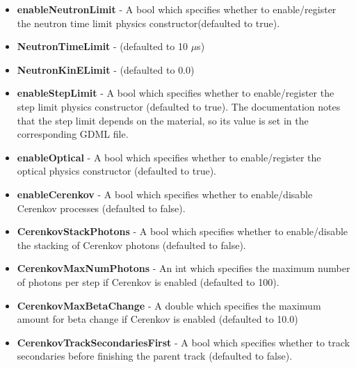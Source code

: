 \documentclass[8pt]{refart}
\begin{document}
\begin{itemize}
\begin{code}{shell}
    G4VPhysicsConstructors in G4PhysicsConstructorRegistry are:
     [  0]  "G4ChargeExchangePhysics"
     [  1]  "G4DecayPhysics"
     [  2]  "G4EmDNAChemistry"
     [  3]  "G4EmDNAChemistry_option1"
     [  4]  "G4EmDNAChemistry_option2"
     [  5]  "G4EmDNAPhysics"
     [  6]  "G4EmDNAPhysics_option1"
     [  7]  "G4EmDNAPhysics_option2"
     .
     .
     .
     [ 78]  "MyG4HadronPhysicsQGSP_BERT_ArHP"
     [ 79]  "MyG4HadronPhysicsQGSP_BERT_HP_NeutronXSBias"
    \end{code}
    which lists all the available physics lists (defaulted to {\color{red}false}).
    \item \textbf{enableNeutronLimit} - A {\color{magenta}bool} which specifies whether to enable/register the neutron time limit physics constructor(defaulted to {true}).
    \item \textbf{NeutronTimeLimit} -  (defaulted to {\color{red}10 $\mu$s})
    \item \textbf{NeutronKinELimit} -  (defaulted to {\color{red}0.0})
    \item \textbf{enableStepLimit} - A {\color{magenta}bool} which specifies whether to enable/register the step limit physics constructor (defaulted to {\color{red}true}).  The documentation notes that the step limit depends on the material, so its value is set in the corresponding GDML file.
    \item \textbf{enableOptical} - A {\color{magenta}bool} which specifies whether to enable/register the optical physics constructor (defaulted to {\color{red}true}).
    \item \textbf{enableCerenkov} - A {\color{magenta}bool} which specifies whether to enable/disable Cerenkov processes (defaulted to {\color{red}false}).
    \item \textbf{CerenkovStackPhotons} - A {\color{magenta}bool} which specifies whether to enable/disable the stacking of Cerenkov photons (defaulted to {\color{red}false}).
    \item \textbf{CerenkovMaxNumPhotons} - An {\color{magenta}int} which specifies the maximum number of photons per step if Cerenkov is enabled (defaulted to {\color{red}100}).
    \item \textbf{CerenkovMaxBetaChange} -  A {\color{magenta}double} which specifies the maximum amount for beta change if Cerenkov is enabled (defaulted to {\color{red}10.0})
    \item \textbf{CerenkovTrackSecondariesFirst} - A {\color{magenta}bool} which specifies whether to track secondaries before finishing the parent track (defaulted to {\color{red}false}).

\end{itemize}
\end{document}
